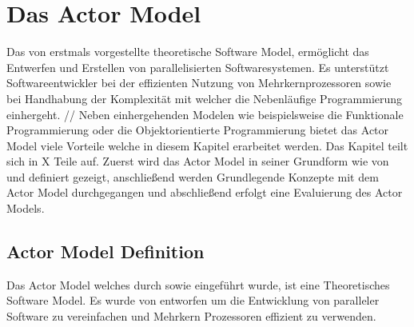 \chapter{Das Actor Model}
Das von \cite{hewitt1973session} erstmals vorgestellte theoretische Software Model, ermöglicht das Entwerfen und Erstellen von parallelisierten Softwaresystemen. Es unterstützt Softwareentwickler bei der effizienten Nutzung von Mehrkernprozessoren sowie bei Handhabung der  Komplexität mit welcher die Nebenläufige Programmierung einhergeht.   //
Neben einhergehenden Modelen wie beispielsweise die Funktionale Programmierung oder die Objektorientierte Programmierung bietet das Actor Model viele Vorteile welche in diesem Kapitel erarbeitet werden.  Das Kapitel teilt sich in X Teile auf. Zuerst wird das Actor Model in seiner Grundform wie von \cite{hewitt1973session} und \cite{Agha1985ActorsSystems} definiert gezeigt, anschließend werden Grundlegende Konzepte mit dem Actor Model durchgegangen und abschließend erfolgt eine Evaluierung des Actor Models.

\section{Actor Model Definition}



Das Actor Model welches durch \cite{hewitt1973session} sowie \cite{Agha1985ActorsSystems} eingeführt wurde, ist eine Theoretisches Software Model. 
Es wurde von \cite{hewitt1973session} entworfen um die Entwicklung von paralleler Software zu vereinfachen und Mehrkern Prozessoren effizient zu verwenden.